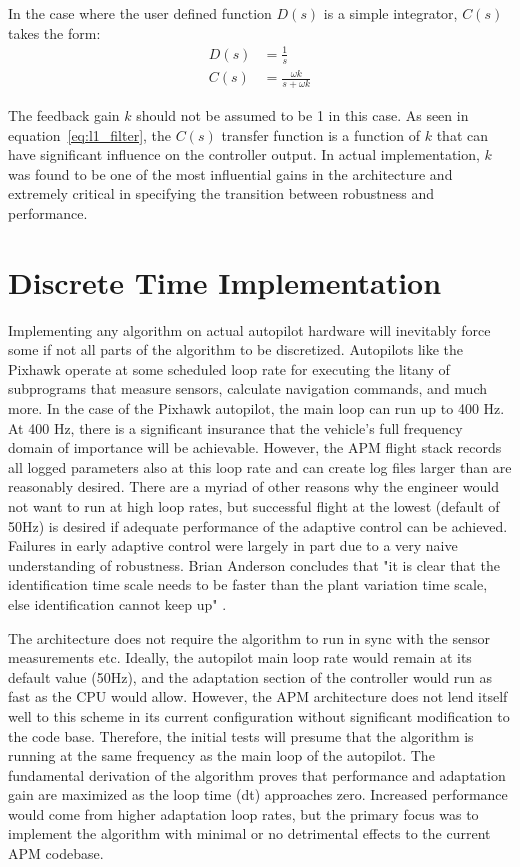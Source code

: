 In the case where the user defined function $D(s)$ is a simple integrator, $C(s)$ takes the form:
\begin{equation}\label{eq:l1_filter}
\begin{split}
D(s)&=\frac{1}{s}\\
C(s)&=\frac{\omega k}{s+\omega k}
\end{split}
\end{equation}

The feedback gain $k$ should not be assumed to be 1 in this case.  As seen in equation~\ref{eq:l1_filter}, the $C(s)$ transfer function is a function of $k$ that can have significant influence on the controller output.  In actual implementation, $k$ was found to be one of the most influential gains in the architecture and extremely critical in specifying the transition between robustness and performance.


\section{\Lone Discrete Time Implementation}
Implementing any algorithm on actual autopilot hardware will inevitably force some if not all parts of the algorithm to be discretized.  Autopilots like the Pixhawk operate at some scheduled loop rate for executing the litany of subprograms that measure sensors, calculate navigation commands, and much more.  In the case of the Pixhawk autopilot, the main loop can run up to 400 Hz.  At 400 Hz, there is a significant insurance that the vehicle's full frequency domain of importance will be achievable.  However, the \ac{APM} flight stack records all logged parameters also at this loop rate and can create log files larger than are reasonably desired.  There are a myriad of other reasons why the engineer would not want to run at high loop rates, but successful flight at the lowest (default of 50Hz) is desired if adequate performance of the adaptive control can be achieved.  Failures in early adaptive control were largely in part due to a very naive understanding of robustness.  Brian Anderson concludes that "it is clear that the identification time scale needs to be faster than the plant variation time scale, else identification cannot keep up" \cite{anderson2005failures}.  

The \Lone architecture does not require the algorithm to run in sync with the sensor measurements etc.  Ideally, the autopilot main loop rate would remain at its default value (50Hz), and the adaptation section of the \Lone controller would run as fast as the CPU would allow.  However, the \ac{APM} architecture does not lend itself well to this scheme in its current configuration without significant modification to the code base.  Therefore, the initial tests will presume that the \Lone algorithm is running at the same frequency as the main loop of the autopilot.  The fundamental derivation of the \Lone algorithm proves that performance and adaptation gain are maximized as the loop time (dt) approaches zero.  Increased performance would come from higher adaptation loop rates, but the primary focus was to implement the \Lone algorithm with minimal or no detrimental effects to the current \ac{APM} codebase.

